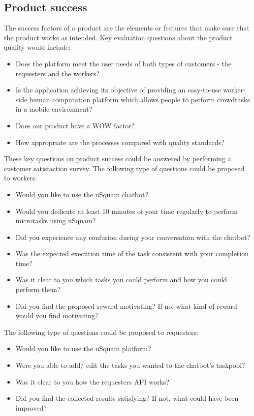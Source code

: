 \documentclass[a4paper,dutch,fleqn]{exam}
\begin{document}
\subsection{Product success}
The success factors of a product are the elements or features that make sure that the product works as intended. Key evaluation questions about the product quality would include:
\begin{itemize}
\itemsep0em 
\item Does the platform meet the user needs of both types of customers - the requesters and the workers?
\item Is the application achieving its objective of providing an easy-to-use worker-side human computation platform which allows people to perform crowdtasks in a mobile environment?
\item Does our product have a WOW factor? 
\item How appropriate are the processes compared with quality standards?
\end{itemize}

These key questions on product success could be answered by performing a customer satisfaction survey. The following type of questions could be proposed to workers: 
\begin{itemize}
\itemsep0em 
\item Would you like to use the uSquam chatbot?
\item Would you dedicate at least 10 minutes of your time regularly to perform microtasks using uSquam?
\item Did you experience any confusion during your conversation with the chatbot?
\item Was the expected execution time of the task consistent with your completion time?
\item Was it clear to you which tasks you could perform and how you could perform them?
\item Did you find the proposed reward motivating? If no, what kind of reward would you find motivating?
\end{itemize}

The following type of questions could be proposed to requesters: 
\begin{itemize}
\itemsep0em 
\item Would you like to use the uSquam platform?
\item Were you able to add/ edit the tasks you wanted to the chatbot's taskpool?
\item Was it clear to you how the requesters API works?
\item Did you find the collected results satisfying? If not, what could have been improved?
\end{itemize}
\end{document}
